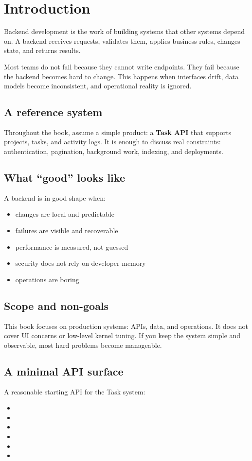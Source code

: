 \chapter{Introduction}

Backend development is the work of building systems that other systems depend on.
A backend receives requests, validates them, applies business rules, changes state, and returns results.

Most teams do not fail because they cannot write endpoints.
They fail because the backend becomes hard to change.
This happens when interfaces drift, data models become inconsistent, and operational reality is ignored.

\section{A reference system}
Throughout the book, assume a simple product:
a \textbf{Task API} that supports projects, tasks, and activity logs.
It is enough to discuss real constraints:
authentication, pagination, background work, indexing, and deployments.

\section{What ``good'' looks like}
A backend is in good shape when:
\begin{itemize}[nosep]
  \item changes are local and predictable
  \item failures are visible and recoverable
  \item performance is measured, not guessed
  \item security does not rely on developer memory
  \item operations are boring
\end{itemize}

\section{Scope and non-goals}
This book focuses on production systems: APIs, data, and operations.
It does not cover UI concerns or low-level kernel tuning.
If you keep the system simple and observable, most hard problems become manageable.

\section{A minimal API surface}
A reasonable starting API for the Task system:
\begin{itemize}[nosep]
  \item {}
  \item {}
  \item {}
  \item {}
  \item {}
  \item {}
\end{itemize}

